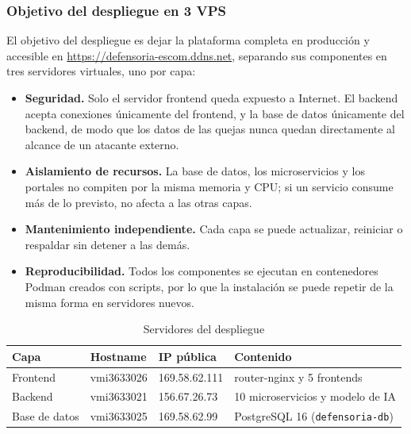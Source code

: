 \subsubsection{Objetivo del despliegue en 3 VPS}
El objetivo del despliegue es dejar la plataforma completa en producción y accesible en \url{https://defensoria-escom.ddns.net}, separando sus componentes en tres servidores virtuales, uno por capa:

\begin{itemize}
  \item \textbf{Seguridad.} Solo el servidor frontend queda expuesto a Internet. El backend acepta conexiones únicamente del frontend, y la base de datos únicamente del backend, de modo que los datos de las quejas nunca quedan directamente al alcance de un atacante externo.
  \item \textbf{Aislamiento de recursos.} La base de datos, los microservicios y los portales no compiten por la misma memoria y CPU; si un servicio consume más de lo previsto, no afecta a las otras capas.
  \item \textbf{Mantenimiento independiente.} Cada capa se puede actualizar, reiniciar o respaldar sin detener a las demás.
  \item \textbf{Reproducibilidad.} Todos los componentes se ejecutan en contenedores Podman creados con scripts, por lo que la instalación se puede repetir de la misma forma en servidores nuevos.
\end{itemize}

\begin{table}[H]
\centering
\caption{Servidores del despliegue}
\small
\begin{tabular}{llll}
\toprule
\textbf{Capa} & \textbf{Hostname} & \textbf{IP pública} & \textbf{Contenido} \\
\midrule
Frontend & vmi3633026 & 169.58.62.111 & router-nginx y 5 frontends \\
Backend & vmi3633021 & 156.67.26.73 & 10 microservicios y modelo de IA \\
Base de datos & vmi3633025 & 169.58.62.99 & PostgreSQL 16 (\texttt{defensoria-db}) \\
\bottomrule
\end{tabular}
\end{table}
